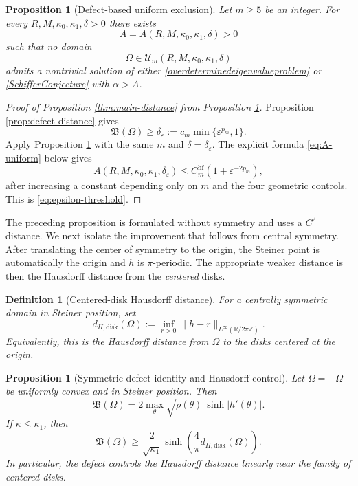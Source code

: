 \documentclass[12pt]{article}
\newcommand{\R}{\mathbb{R}}
\numberwithin{equation}{section}
\newtheorem{definition}[theorem]{Definition}
\newtheorem{proposition}[theorem]{Proposition}
\numberwithin{equation}{section}
\newcommand{\cU}{\mathcal{U}}
\begin{document}
\begin{proposition}[Defect-based uniform exclusion]\label{thm:uniform}
Let $m\geq5$ be an integer. For every
$R,M,\kappa_0,\kappa_1,\delta>0$ there exists
\[
A=A\left(R,M,\kappa_0,\kappa_1,\delta\right)>0
\]
such that no domain
\[
\Omega\in\cU_m\left(R,M,\kappa_0,\kappa_1,\delta\right)
\]
admits a nontrivial solution of either \eqref{overdeterminedeigenvalueproblem} or \eqref{SchifferConjecture} with
$\alpha>A$.
\end{proposition}

\begin{proof}[Proof of Proposition \ref{thm:main-distance} from Proposition
\ref{thm:uniform}]
Proposition \ref{prop:defect-distance} gives
\[
 \mathfrak B(\Omega)\geq
 \delta_\varepsilon:=c_m\min\{\varepsilon^{p_m},1\}.
\]
Apply Proposition \ref{thm:uniform} with the same $m$ and
$\delta=\delta_\varepsilon$.  The
explicit formula \eqref{eq:A-uniform} below gives
\[
 A\left(R,M,\kappa_0,\kappa_1,\delta_\varepsilon\right)
 \leq C_m^{\mathrm{hf}}\left(1+\varepsilon^{-2p_m}\right),
\]
after increasing a constant depending only on $m$ and the four geometric
controls.
This is \eqref{eq:epsilon-threshold}.
\end{proof}

The preceding proposition is formulated without symmetry and uses a $C^2$
distance. We next isolate the improvement that follows from central
symmetry. After translating the center of symmetry to the origin, the
Steiner point is automatically the origin and $h$ is $\pi$-periodic. The
appropriate weaker distance is then the Hausdorff distance from the
\emph{centered} disks.

\begin{definition}[Centered-disk Hausdorff distance]\label{def:H-distance}
\emph{For a centrally symmetric domain in Steiner position, set
\begin{equation*}\label{eq:H-distance}
 d_{H,{\mathrm{disk}}}(\Omega)
 :=\inf_{r>0}\|h-r\|_{L^\infty(\R/2\pi\mathbb Z)}.
\end{equation*}
Equivalently, this is the Hausdorff distance from $\Omega$ to the disks
centered at the origin.}
\end{definition}

\begin{proposition}[Symmetric defect identity and Hausdorff control]
\label{prop:symmetric-defect}
Let $\Omega=-\Omega$ be uniformly convex and in Steiner position. Then
\begin{equation}\label{eq:symmetric-defect-identity}
 \mathfrak B(\Omega)
 =2\max_{\theta}\sqrt{\rho(\theta)}\,\sinh|h'(\theta)|.
\end{equation}
If $\kappa\leq\kappa_1$, then
\begin{equation}\label{eq:defect-symmetric-lower}
 \mathfrak B(\Omega)
 \geq\frac{2}{\sqrt{\kappa_1}}
 \sinh\!\left(\frac{4}{\pi}d_{H,{\mathrm{disk}}}(\Omega)\right).
\end{equation}
In particular, the defect controls the Hausdorff distance linearly near the
family of centered disks.
\end{proposition}
\end{document}
